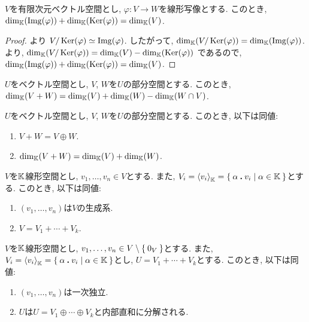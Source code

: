 \begin{cor}
\label{thm:dimthm}
  $V$を有限次元ベクトル空間とし,
  $\varphi\colon V\to W$を線形写像とする.
  このとき,
  $\dim_{\mathbb{K}}(\operatorname{Img}(\varphi))+\dim_{\mathbb{K}}(\operatorname{Ker}(\varphi))=\dim_{\mathbb{K}}(V)$.
\end{cor}
\begin{proof}
  より $V/\operatorname{Ker}(\varphi) \simeq \operatorname{Img}(\varphi)$.
  したがって,
  $\dim_{\mathbb{K}}(V/\operatorname{Ker}(\varphi))=\dim_{\mathbb{K}}(\operatorname{Img}(\varphi))$.
  より,
  $\dim_{\mathbb{K}}(V/\operatorname{Ker}(\varphi))=\dim_{\mathbb{K}}(V)-\dim_{\mathbb{K}}(\operatorname{Ker}(\varphi))$
  であるので,
  $\dim_{\mathbb{K}}(\operatorname{Img}(\varphi))+\dim_{\mathbb{K}}(\operatorname{Ker}(\varphi))=\dim_{\mathbb{K}}(V)$.
\end{proof}



\begin{prop}
  $U$をベクトル空間とし, $V$, $W$を$U$の部分空間とする.
  このとき,  $\dim_{\mathbb{K}}(V+W)=\dim_{\mathbb{K}}(V)+\dim_{\mathbb{K}}(W) - \dim_{\mathbb{K}}(W\cap V)$.
\end{prop}

\begin{cor}
  $U$をベクトル空間とし, $V$, $W$を$U$の部分空間とする.
  このとき, 以下は同値:
  \begin{enumerate}
  \item $V+W=V\oplus W$.
  \item $\dim_{\mathbb{K}}(V+W)=\dim_{\mathbb{K}}(V)+\dim_{\mathbb{K}}(W)$.
  \end{enumerate}
\end{cor}



\begin{prop}
  $V$を$\mathbb{K}$線形空間とし,
  $v_1,\ldots, v_n\in V$とする.
  また,
  $V_i=\Braket{v_i}_{\mathbb{K}}=\Set{\alpha \mathbin{\boldsymbol{.}}v_i|\alpha \in\mathbb{K}}$とする.
  このとき, 以下は同値:
  \begin{enumerate}
  \item $(v_1,\ldots, v_n)$は$V$の生成系.
  \item $V=V_1+\cdots + V_k$.
  \end{enumerate}
\end{prop}

\begin{prop}
  $V$を$\mathbb{K}$線形空間とし,
  $v_1,\ldots, v_n\in V\setminus\Set{0_V}$とする.
  また,
  $V_i=\Braket{v_i}_{\mathbb{K}}=\Set{\alpha \mathbin{\boldsymbol{.}}v_i|\alpha\in\mathbb{K}}$とし,
  $U=V_1+\cdots + V_k$とする.
  このとき, 以下は同値:
  \begin{enumerate}
  \item $(v_1,\ldots, v_n)$は一次独立.
  \item $U$は$U=V_1\oplus\cdots \oplus V_k$と内部直和に分解される.
  \end{enumerate}
\end{prop}

